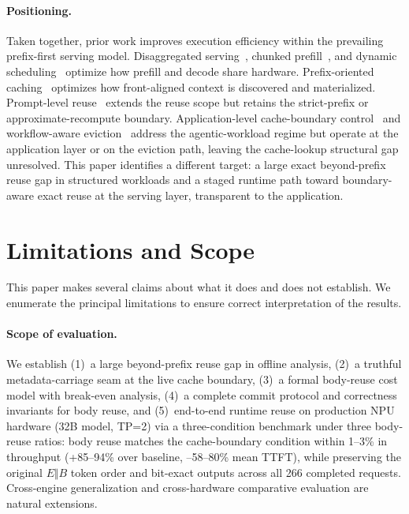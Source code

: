 \documentclass[conference]{IEEEtran}
\begin{document}
\paragraph{Positioning.}
Taken together, prior work improves execution efficiency within the prevailing prefix-first serving model. Disaggregated serving~\cite{zhong2024distserve,patel2024splitwise}, chunked prefill~\cite{agrawal2024sarathi}, and dynamic scheduling~\cite{sun2024llumnix} optimize how prefill and decode share hardware. Prefix-oriented caching~\cite{zheng2024sglang,ye2024chunkattention,lee2024infinigen} optimizes how front-aligned context is discovered and materialized. Prompt-level reuse~\cite{gim2024promptcache,srivatsa2024preble,yao2025cacheblend} extends the reuse scope but retains the strict-prefix or approximate-recompute boundary. Application-level cache-boundary control~\cite{lumer2026dontbreak} and workflow-aware eviction~\cite{pan2025kvflow} address the agentic-workload regime but operate at the application layer or on the eviction path, leaving the cache-lookup structural gap unresolved. This paper identifies a different target: a large exact beyond-prefix reuse gap in structured workloads and a staged runtime path toward boundary-aware exact reuse at the serving layer, transparent to the application.

\section{Limitations and Scope}

This paper makes several claims about what it does and does not establish. We enumerate the principal limitations to ensure correct interpretation of the results.

\paragraph{Scope of evaluation.}
We establish (1)~a large beyond-prefix reuse gap in offline analysis, (2)~a truthful metadata-carriage seam at the live cache boundary, (3)~a formal body-reuse cost model with break-even analysis, (4)~a complete commit protocol and correctness invariants for body reuse, and (5)~end-to-end runtime reuse on production NPU hardware (32B model, TP=2) via a three-condition benchmark under three body-reuse ratios: body reuse matches the cache-boundary condition within 1--3\% in throughput (+85--94\% over baseline, --58--80\% mean TTFT), while preserving the original $E \Vert B$ token order and bit-exact outputs across all 266 completed requests. Cross-engine generalization and cross-hardware comparative evaluation are natural extensions.
\end{document}
